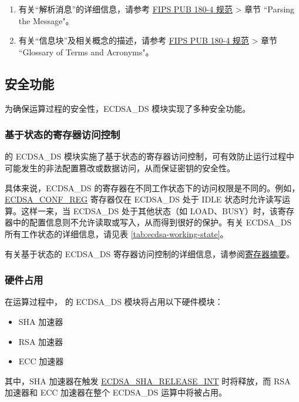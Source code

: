 \documentclass[main\_\_CN.tex]{subfiles}
\begin{document}
\begin{tiplisting}
\begin{enumerate}
\vspace{-2.5em}
    \item 有关“解析消息”的详细信息，请参考 \href{https://doi.org/10.6028/NIST.FIPS.180-4}{FIPS PUB 180-4 规范} > 章节 ``Parsing the Message"。
    \item 有关“信息块”及相关概念的描述，请参考 \href{https://doi.org/10.6028/NIST.FIPS.180-4}{FIPS PUB 180-4 规范} > 章节 ``Glossary of Terms and Acronyms"。
\end{enumerate}
\end{tiplisting}


\subsection{安全功能}
\label{sec:ecdsa-security_features}
为确保运算过程的安全性，ECDSA\_DS 模块实现了多种安全功能。

\subsubsection{基于状态的寄存器访问控制}

\chipseries{} 的 ECDSA\_DS 模块实施了基于状态的寄存器访问控制，可有效防止运行过程中可能发生的非法配置篡改或数据访问，从而保证密钥的安全性。

具体来说，ECDSA\_DS 的寄存器在不同工作状态下的访问权限是不同的。例如，\hyperref[regdesc:ECDSACONFREG]{ECDSA\_CONF\_REG} 寄存器仅在 ECDSA\_DS 处于 IDLE 状态时允许读写运算。这样一来，当 ECDSA\_DS 处于其他状态（如 LOAD、BUSY）时，该寄存器中的配置信息则不允许读取或写入，从而得到很好的保护。有关 ECDSA\_DS 所有工作状态的详细信息，请见表 \ref{tab:ecdsa-working-state}。

有关基于状态的 ECDSA\_DS 寄存器访问控制的详细信息，请参阅\hyperref[sec:ecdsa-reg-summ]{寄存器摘要}。

\subsubsection{硬件占用}

在运算过程中，\chipname{} 的 ECDSA\_DS 模块将占用以下硬件模块：
\begin{itemize}
    \item SHA 加速器
    \item RSA 加速器
    \item ECC 加速器
\end{itemize}
其中，SHA 加速器在触发 \hyperref[int:ECDSASHARELEASEINT]{ECDSA\_SHA\_RELEASE\_INT} 时将释放，而 RSA 加速器和 ECC 加速器在整个 ECDSA\_DS 运算中将被占用。
\end{document}
